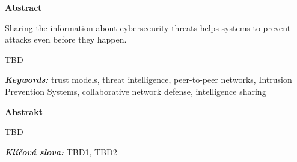 \newenvironment{abstractpage}
  {\cleardoublepage\thispagestyle{empty}}
  {\vfill\cleardoublepage}
\newenvironment{abstract}[1]
  {\bigskip
   \begin{center}\bfseries#1\end{center}\small\leftskip=0.5cm\rightskip=0.5cm}
  {\par\bigskip}

\providecommand{\keywords}[2]{\footnotesize\textbf{\textit{#1:}} #2}

\begin{abstractpage}
\begin{abstract}{Abstract}
Sharing the information about cybersecurity threats helps systems to prevent attacks even before they happen.


TBD 
\end{abstract}

\keywords{Keywords}{trust models, threat intelligence, peer-to-peer networks, Intrusion Prevention Systems, collaborative network defense, intelligence sharing}

\vspace*{\fill}

\begin{abstract}{Abstrakt}
    TBD 
    
\end{abstract}
\keywords{Klíčová slova}{TBD1, TBD2} 

\end{abstractpage}
\thispagestyle{empty}

\cleardoublepage